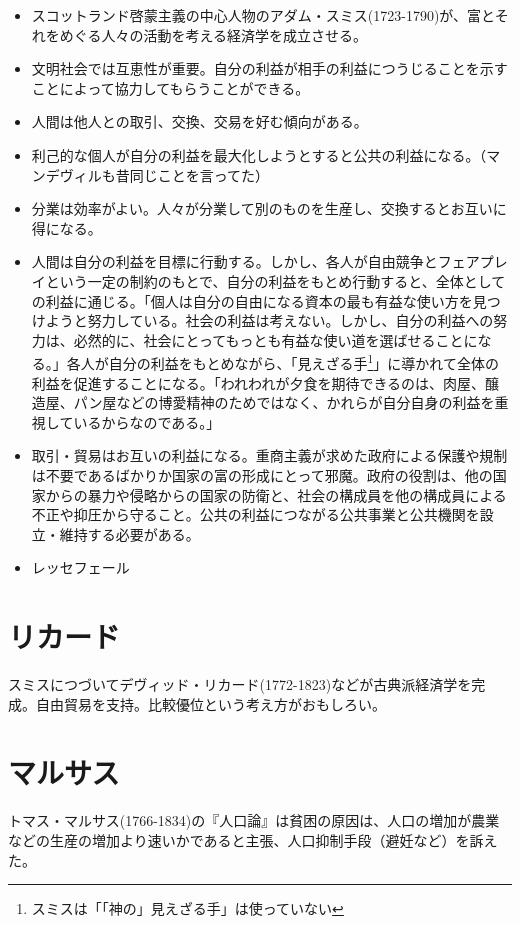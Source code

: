 \documentclass[uplatex,dvipdfmx]{jsarticle} \usepackage{mystyle}%
\begin{document}
\begin{itemize}

\item スコットランド啓蒙主義の中心人物のアダム・スミス(1723-1790)が、富とそれをめぐる人々の活動を考える経済学を成立させる。

\item 文明社会では互恵性が重要。自分の利益が相手の利益につうじることを示すことによって協力してもらうことができる。
  
\item 人間は他人との取引、交換、交易を好む傾向がある。
  
\item 利己的な個人が自分の利益を最大化しようとすると公共の利益になる。（マンデヴィルも昔同じことを言ってた）

\item   分業は効率がよい。人々が分業して別のものを生産し、交換するとお互いに得になる。

\item 人間は自分の利益を目標に行動する。しかし、各人が自由競争とフェアプレイという一定の制約のもとで、自分の利益をもとめ行動すると、全体としての利益に通じる。「個人は自分の自由になる資本の最も有益な使い方を見つけようと努力している。社会の利益は考えない。しかし、自分の利益への努力は、必然的に、社会にとってもっとも有益な使い道を選ばせることになる。」各人が自分の利益をもとめながら、「見えざる手\footnote{スミスは「「神の」見えざる手」は使っていない}」に導かれて全体の利益を促進することになる。「われわれが夕食を期待できるのは、肉屋、醸造屋、パン屋などの博愛精神のためではなく、かれらが自分自身の利益を重視しているからなのである。」

\item   取引・貿易はお互いの利益になる。重商主義が求めた政府による保護や規制は不要であるばかりか国家の富の形成にとって邪魔。政府の役割は、他の国家からの暴力や侵略からの国家の防衛と、社会の構成員を他の構成員による不正や抑圧から守ること。公共の利益につながる公共事業と公共機関を設立・維持する必要がある。

\item レッセフェール


\end{itemize}

\section{リカード}

スミスにつづいてデヴィッド・リカード(1772-1823)などが古典派経済学を完成。自由貿易を支持。比較優位という考え方がおもしろい。


\section{マルサス}


トマス・マルサス(1766-1834)の『人口論』は貧困の原因は、人口の増加が農業などの生産の増加より速いかであると主張、人口抑制手段（避妊など）を訴えた。





\ifx\mybook\undefined


\end{document}
